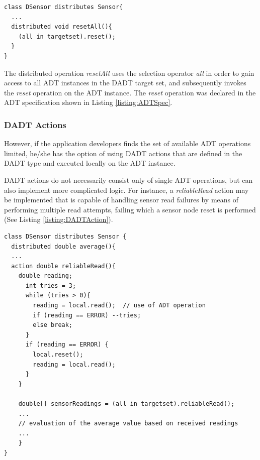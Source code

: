 \begin{lstlisting}[frame=trbl, basewidth={0.55em, 0.6em}, captionpos=b, 
basicstyle=\ttfamily\footnotesize, breaklines, caption = Use of DADT Selection Operator, label = listing:DADTOperator]  
class DSensor distributes Sensor{
  ...
  distributed void resetAll(){
    (all in targetset).reset();
  }
}
\end{lstlisting}

The distributed operation \emph{resetAll} uses the selection operator 
\emph{all} in order to gain access to all ADT instances in the DADT
target set, and subsequently invokes the \emph{reset} operation on the ADT
instance. The \emph{reset} operation was declared in the ADT specification
shown in Listing \ref{listing:ADTSpec}.

\subsubsection{DADT Actions}
However, if the application developers finds the set of available ADT operations limited, he/she has the option of using DADT actions that are defined in the DADT type and executed locally on the ADT instance.

DADT actions do not necessarily consist only of single ADT operations, but can
also implement more complicated logic. For instance, a
\emph{reliableRead} action may be implemented that is capable of handling sensor read failures by means of performing multiple read attempts, failing which
a sensor node reset is performed (See Listing \ref{listing:DADTAction}).
 
\begin{lstlisting}[frame=trbl, basewidth={0.55em, 0.6em}, captionpos=b, 
basicstyle=\ttfamily\footnotesize, breaklines, caption = Use of DADT Action (reproduced from \cite{migliavacca_DADT:2006}), label = listing:DADTAction]  
class DSensor distributes Sensor {
  distributed double average(){
  ...  
  action double reliableRead(){
    double reading;
      int tries = 3;
      while (tries > 0){
        reading = local.read();  // use of ADT operation
        if (reading == ERROR) --tries;
        else break; 
      }
      if (reading == ERROR) {
        local.reset();
        reading = local.read();
      }
    }

    double[] sensorReadings = (all in targetset).reliableRead();
    ...
    // evaluation of the average value based on received readings	
    ...
    }
}
\end{lstlisting}

